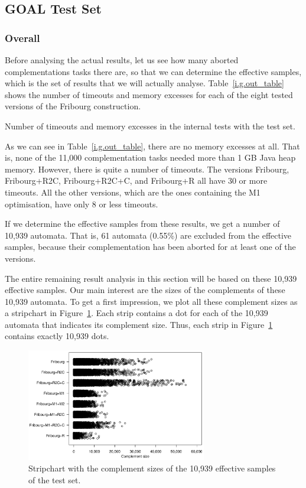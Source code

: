 \subsection{GOAL Test Set}
\label{5_internal_goal}

\subsubsection{Overall}
Before analysing the actual results, let us see how many aborted complementations tasks there are, so that we can determine the effective samples, which is the set of results that we will actually analyse. Table~\ref{i.g.out_table} shows the number of timeouts and memory excesses for each of the eight tested versions of the Fribourg construction.

\begin{table}[ht]
\centering

\caption{Number of timeouts and memory excesses in the internal tests with the \goal{} test set.}
\label{i.g.out_table}
\end{table}

As we can see in Table~\ref{i.g.out_table}, there are no memory excesses at all. That is, none of the 11,000 complementation tasks needed more than 1 GB Java heap memory. However, there is quite a number of timeouts. The versions Fribourg, Fribourg+R2C, Fribourg+R2C+C, and Fribourg+R all have 30 or more timeouts. All the other versions, which are the ones containing the M1 optimisation, have only 8 or less timeouts.

If we determine the effective samples from these results, we get a number of 10,939 automata. That is, 61 automata (0.55\%) are excluded from the effective samples, because their complementation has been aborted for at least one of the versions.

The entire remaining result analysis in this section will be based on these 10,939 effective samples. Our main interest are the sizes of the complements of these 10,939 automata. To get a first impression, we plot all these complement sizes as a stripchart in Figure~\ref{i.g.stripchart}. Each strip contains a dot for each of the 10,939 automata that indicates its complement size. Thus, each strip in Figure~\ref{i.g.stripchart} contains exactly 10,939 dots.

\begin{figure}[ht]
\centering
\includegraphics[width=0.7\textwidth]{figures/r/internal/goal/s.stripchart.pdf}
\caption{Stripchart with the complement sizes of the 10,939 effective samples of the \goal{} test set.}
\label{i.g.stripchart}
\end{figure}

